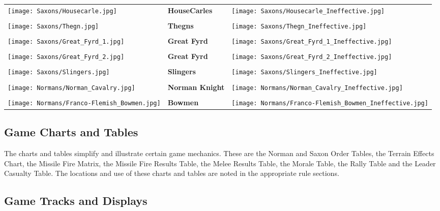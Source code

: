 \renewcommand\tabularxcolumn[1]{m{#1}}
\begin{tabularx}{0.5\textwidth}{
    >{\raggedright\arraybackslash}X
    >{\centering\arraybackslash}X
    >{\raggedleft\arraybackslash}X}

  \texttt{[image: Saxons/Housecarle.jpg]} & \textbf{HouseCarles} & \texttt{[image: Saxons/Housecarle\_Ineffective.jpg]} \\ \\
  \texttt{[image: Saxons/Thegn.jpg]} & \textbf{Thegns} & \texttt{[image: Saxons/Thegn\_Ineffective.jpg]} \\ \\
  \texttt{[image: Saxons/Great\_Fyrd\_1.jpg]} & \textbf{Great Fyrd} & \texttt{[image: Saxons/Great\_Fyrd\_1\_Ineffective.jpg]} \\ \\
  \texttt{[image: Saxons/Great\_Fyrd\_2.jpg]} & \textbf{Great Fyrd} & \texttt{[image: Saxons/Great\_Fyrd\_2\_Ineffective.jpg]} \\ \\
  \texttt{[image: Saxons/Slingers.jpg]} & \textbf{Slingers} & \texttt{[image: Saxons/Slingers\_Ineffective.jpg]} \\ \\
  \texttt{[image: Normans/Norman\_Cavalry.jpg]} & \textbf{Norman Knight} & \texttt{[image: Normans/Norman\_Cavalry\_Ineffective.jpg]} \\ \\
  \texttt{[image: Normans/Franco-Flemish\_Bowmen.jpg]} & \textbf{Bowmen} & \texttt{[image: Normans/Franco-Flemish\_Bowmen\_Ineffective.jpg]}
\end{tabularx}

\subsection{Game Charts and Tables}


The charts and tables simplify and illustrate certain game mechanics. These are the Norman and Saxon Order Tables, the Terrain Effects Chart, the Missile Fire Matrix, the Missile Fire Results Table, the Melee Results Table, the Morale Table, the Rally Table and the Leader Casualty Table. The locations and use of these charts and tables are noted in the appropriate rule sections.

\subsection{Game Tracks and Displays}

